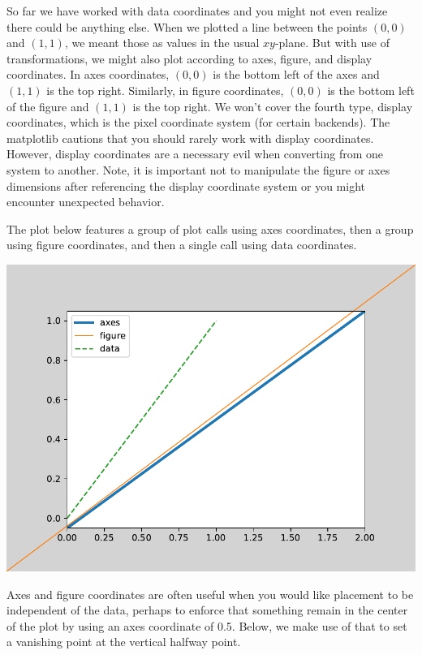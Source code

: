 So far we have worked with data coordinates and you might not even realize there could be anything else. When we plotted a line between the points $(0,0)$ and $(1,1)$, we meant those as values in the usual $xy$-plane. But with use of transformations, we might also plot according to axes, figure, and display coordinates. In axes coordinates, $(0,0)$ is the bottom left of the axes and $(1,1)$ is the top right. Similarly, in figure coordinates, $(0,0)$ is the bottom left of the figure and $(1,1)$ is the top right. We won't cover the fourth type, display coordinates, which is the pixel coordinate system (for certain backends). The matplotlib  cautions that you should rarely work with display coordinates. However, display coordinates are a necessary evil when converting from one system to another. Note, it is important not to manipulate the figure or axes dimensions after referencing the display coordinate system or you might encounter unexpected behavior. 

The plot below features a group of plot calls using axes coordinates, then a group using figure coordinates, and then a single call using data coordinates. 

\begin{center}
    \includegraphics[width = .8\textwidth]{figures/proseplots/coords.pdf}
\end{center}


Axes and figure coordinates are often useful when you would like placement to be independent of the data, perhaps to enforce that something remain in the center of the plot by using an axes coordinate of 0.5. Below, we make use of that to set a vanishing point at the vertical halfway point.

